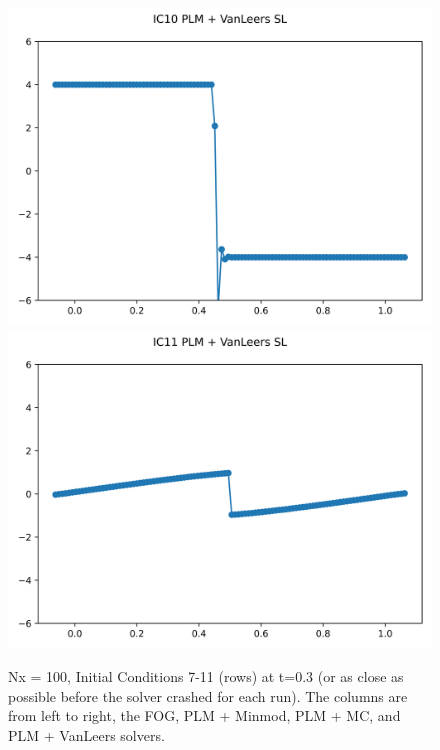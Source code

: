 \documentclass{article}
\begin{document}
\begin{figure}[t]
        \includegraphics[width=.95\textwidth]{../../code/hires_IC10Methodpv_plot.png}
        \includegraphics[width=.95\textwidth]{../../code/hires_IC11Methodpv_plot.png}
    \emp
    \caption{Nx = 100, Initial Conditions 7-11 (rows) at t=0.3 (or as close as possible before the
    solver crashed for each run). The columns are from left to right, the FOG,
    PLM + Minmod, PLM + MC, and PLM + VanLeers solvers.}
    \label{fig:hires_sol_7_11}
\end{figure}
\end{document}
